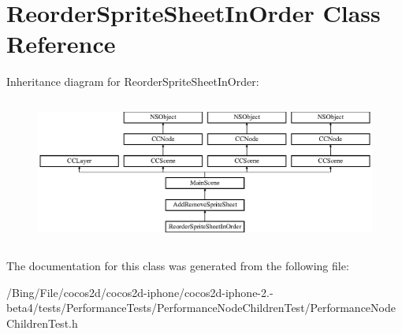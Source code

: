 \hypertarget{interface_reorder_sprite_sheet_in_order}{\section{Reorder\-Sprite\-Sheet\-In\-Order Class Reference}
\label{interface_reorder_sprite_sheet_in_order}
}
Inheritance diagram for Reorder\-Sprite\-Sheet\-In\-Order\-:\begin{figure}[H]
\begin{center}
\leavevmode
\includegraphics[height=4.800000cm]{interface_reorder_sprite_sheet_in_order}
\end{center}
\end{figure}


The documentation for this class was generated from the following file\-:\begin{DoxyCompactItemize}
\item 
/\-Bing/\-File/cocos2d/cocos2d-\/iphone/cocos2d-\/iphone-\/2.-\/beta4/tests/\-Performance\-Tests/\-Performance\-Node\-Children\-Test/Performance\-Node\-Children\-Test.\-h\end{DoxyCompactItemize}
